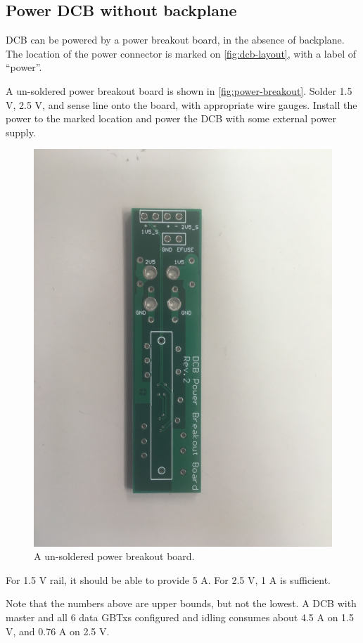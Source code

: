 \subsection{Power DCB without backplane}
DCB can be powered by a power breakout board, in the absence of backplane.
The location of the power connector is marked on \autoref{fig:dcb-layout}, with
a label of ``power''.

A un-soldered power breakout board is shown in \autoref{fig:power-breakout}.
Solder 1.5 V, 2.5 V, and sense line onto the board, with appropriate wire
gauges.
Install the power to the marked location and power the DCB with some external
power supply.

\begin{figure}[!ht]
    \centering
    \includegraphics[width=0.9\linewidth]{res/power_breakout_board.jpg}
    \caption{A un-soldered power breakout board.}
    \label{fig:power-breakout}
\end{figure}

\begin{leftbar}
    For 1.5 V rail, it should be able to provide 5 A.
    For 2.5 V, 1 A is sufficient.

    Note that the numbers above are upper bounds, but not the lowest.
    A DCB with master and all 6 data GBTxs configured and idling consumes about
    4.5 A on 1.5 V, and 0.76 A on 2.5 V.
\end{leftbar}
